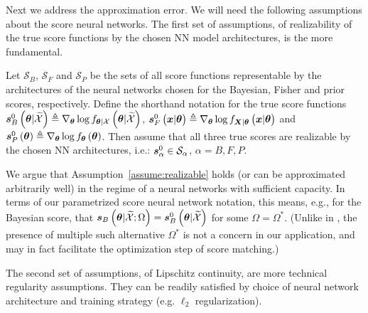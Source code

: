{Next we address the approximation error. We will need the following assumptions about the score neural networks. The first set of assumptions, of realizability of the true score functions by the chosen NN model architectures, is the more fundamental.}
\begin{assumption}\label{assume:realizable}
Let {$\mathcal{S}_B$, $\mathcal{S}_F$ and $\mathcal{S}_P$} be the sets of all score functions representable by the  architectures of the neural networks chosen for the Bayesian, Fisher and prior scores, respectively. {Define the shorthand notation for the true score functions $\bm{s}^{0}_{B}\left(\bm{\theta}|\widetilde{\mathcal{X}}\right) \triangleq\nabla_{\bm{\theta}}\log f_{ \bm{\theta} | \mathcal{X}}\left(\bm{\theta}|\widetilde{\mathcal{X}}\right)$,}  $\vectorsym{s}^{0}_{F}\brackets{\x|\p} \triangleq\nabla_{\p}\log\probt{\x|\p}{\X|\p}$ and $\bm{s}^{0}_{P}\left(\bm{\theta}\right)\triangleq\nabla_{\bm{\theta}}\log f_{\bm{\theta}}\left(\bm{\theta}\right)$. Then assume that {all three true scores are realizable {by the chosen NN architectures,} i.e.}:
{$\bm{s}^{0}_\alpha \in \mathcal{S}_\alpha$, $\alpha= B, F, P$.}
\end{assumption}

We argue that Assumption~\ref{assume:realizable} holds {(or can be approximated arbitrarily well)} in the regime of a neural networks with sufficient capacity. {In terms of our parametrized score neural network notation, this means, e.g., for the Bayesian score, that $\bm{s}_{B}\left(\bm{\theta}|\widetilde{\mathcal{X}}; \Omega\right) = \bm{s}^{0}_{B}\left(\bm{\theta}|\widetilde{\mathcal{X}}\right)$ for some $\Omega=\Omega^{*}$. (Unlike in \cite{hyvarinen2005estimation}, the presence of multiple such alternative $\Omega^*$ is not a concern in our application, and may in fact facilitate the optimization step of score matching.)} 

{The second set of assumptions, of Lipschitz continuity, are more technical regularity assumptions.}
They can be readily satisfied by choice of neural network architecture and training strategy (e.g. $\ell_2$ regularization).

